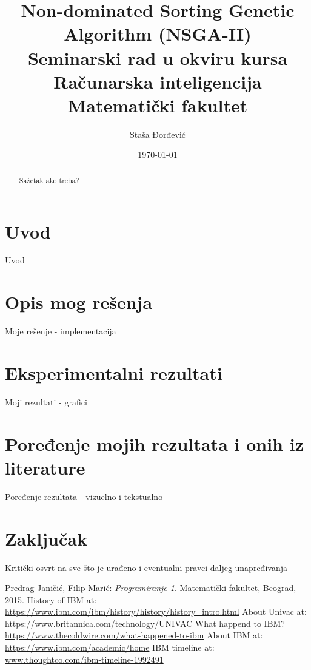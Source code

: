 \documentclass[12pt]{article}
\title{Non-dominated Sorting Genetic Algorithm (NSGA-II) \\
\normalsize Seminarski rad u okviru kursa\\ Računarska inteligencija
\\Matematički fakultet}
\author{Staša Đorđević}
\date{\today} %
\begin{document}
\maketitle

\begin{abstract}
Sažetak ako treba?
\end{abstract}

\section{Uvod}
Uvod

\section{Opis mog rešenja}
Moje rešenje - implementacija

\section{Eksperimentalni rezultati}
Moji rezultati - grafici

\section{Poređenje mojih rezultata i onih iz literature}
Poređenje rezultata - vizuelno i tekstualno

\section{Zaključak}
Kritički osvrt na sve što je urađeno i eventualni pravci daljeg unapređivanja

\renewcommand{\refname}{Literatura}
\begin{thebibliography}{10}

 Predrag Janičić, Filip Marić: \emph{Programiranje 1}. Matematički fakultet, Beograd, 2015. 
 History of IBM at:\\ \url{https://www.ibm.com/ibm/history/history/history_intro.html} 
 About Univac at:\\ \url{https://www.britannica.com/technology/UNIVAC} 
 What happend to IBM?\\ \url{https://www.thecoldwire.com/what-happened-to-ibm} 
 About IBM at: \url{https://www.ibm.com/academic/home} 
 IBM timeline at: \url{www.thoughtco.com/ibm-timeline-1992491}

\end{thebibliography}
\end{document}
